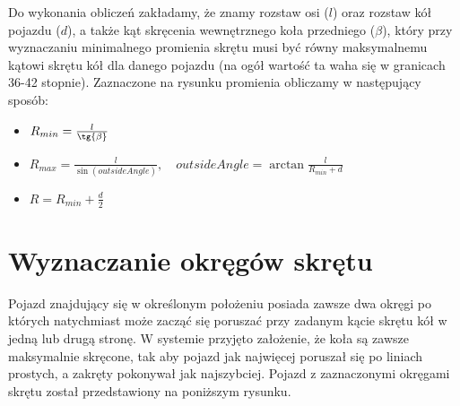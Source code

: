 \documentclass[a4paper,11pt,twoside]{report}
\theoremstyle{definition}
\begin{document}
Do wykonania obliczeń zakładamy, że znamy rozstaw osi ($l$) oraz rozstaw kół pojazdu ($d$), a także kąt skręcenia wewnętrznego koła przedniego ($\beta$), który przy wyznaczaniu minimalnego promienia skrętu musi być równy maksymalnemu kątowi skrętu kół dla danego pojazdu (na ogół wartość ta waha się w granicach 36-42 stopnie). Zaznaczone na rysunku promienia obliczamy w następujący sposób:

\begin{itemize}
	\item $R_{min} = \frac{l}{\tg{\beta}}$
	\item $R_{max} = \frac{l}{\sin{(outsideAngle)}}, \quad outsideAngle = \arctan{\frac{l}{R_{min} + d}}$
	\item $R = R_{min} + \frac{d}{2}$
\end{itemize}

\section{Wyznaczanie okręgów skrętu}

Pojazd znajdujący się w określonym położeniu posiada zawsze dwa okręgi po których natychmiast może zacząć się poruszać przy zadanym kącie skrętu kół w jedną lub drugą stronę. W systemie przyjęto założenie, że koła są zawsze maksymalnie skręcone, tak aby pojazd jak najwięcej poruszał się po liniach prostych, a zakręty pokonywał jak najszybciej. Pojazd z zaznaczonymi okręgami skrętu został przedstawiony na poniższym rysunku.
\end{document}
